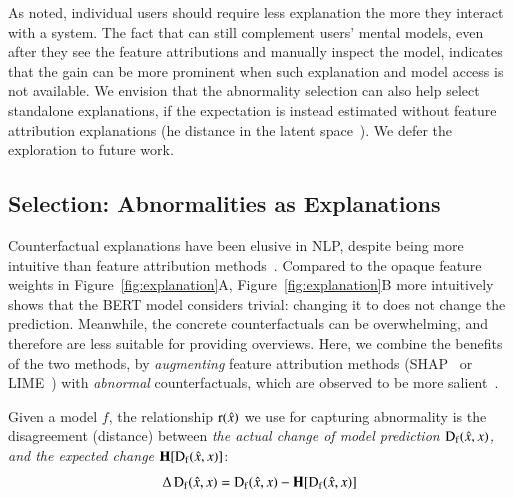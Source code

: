 As \citet{miller} noted, individual users should require less explanation the more they interact with a system.
The fact that \sysname can still complement users' mental models, even after they see the feature attributions and manually inspect the model, indicates that the gain can be more prominent when such explanation and model access is not available. 
We envision that the abnormality selection can also help select standalone explanations, if the expectation is instead estimated without feature attribution explanations (\eg he distance in the latent space~\cite{reimers-2019-sentence-bert}).
We defer the exploration to future work.















\subsection{Selection: Abnormalities as Explanations}
\label{subsec:local_explain}


Counterfactual explanations have been elusive in NLP, despite being more intuitive than feature attribution methods~\cite{miller}.
Compared to the opaque feature weights in Figure~\ref{fig:explanation}A, Figure~\ref{fig:explanation}B more intuitively shows that the BERT \qqp model considers  trivial: 
changing it to  does not change the prediction.
Meanwhile, the concrete counterfactuals can be overwhelming, and therefore are less suitable for providing overviews.
Here, we combine the benefits of the two methods, by \emph{augmenting} feature attribution methods (\eg SHAP~\cite{NIPS2017_7062} or LIME~\cite{Ribeiro2016WhySI}) with \emph{abnormal} counterfactuals, which are observed to be more salient~\cite{miller}.

Given a model $f$, the relationship $\operatorname*{r}(\hat{x})$ we use for capturing abnormality is the disagreement (distance) between \emph{the actual change of model prediction $\operatorname*{D_f}(\hat{x}, x)$, and the expected change $\operatorname*{\mathbf{H}}[\operatorname*{D_f}(\hat{x}, x)]$}:
$$\Delta\operatorname*{D_f}(\hat{x}, x) = \operatorname*{D_f}(\hat{x}, x)-\operatorname*{\mathbf{H}}[\operatorname*{D_f}(\hat{x}, x)]$$

